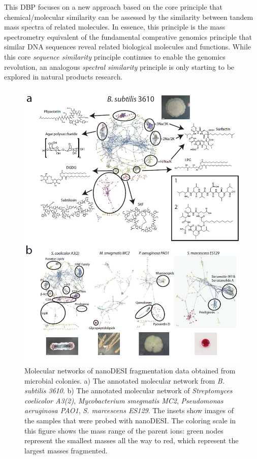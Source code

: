 \documentclass[arial,11pt]{article}
\begin{document}
This DBP focuses on a new approach based on the core principle that chemical/molecular similarity can be assessed by the similarity between tandem mass spectra of related molecules. In essence, this principle is the mass spectrometry equivalent of the fundamental comprative genomics principle that similar DNA sequences reveal related biological molecules and functions.
While this core {\em sequence similarity} principle continues to enable the genomics revolution, an analogous {\em spectral similarity} principle is only starting to be explored in natural products research.

\begin{figure}[htb!]
    \centering
    \includegraphics[width=.8\textwidth]{figures/figMolNets.png}
  \caption{\footnotesize  Molecular networks of nanoDESI fragmentation data obtained from microbial colonies. a) The annotated molecular network from {\em B. subtilis 3610}. b) The annotated molecular network of {\em Streptomyces coelicolor A3(2)}, {\em Mycobacterium smegmatis MC2}, {\em Pseudomonas aeruginosa PAO1}, {\em S. marcescens ES129}. The insets show images of the samples that were probed with nanoDESI. The coloring scale in this figure shows the mass range of the parent ions: green nodes represent the smallest masses all the way to red, which represent the largest masses fragmented. }
  \label{fig.dbp.dorrestein.molnets}
\end{figure}
\end{document}
